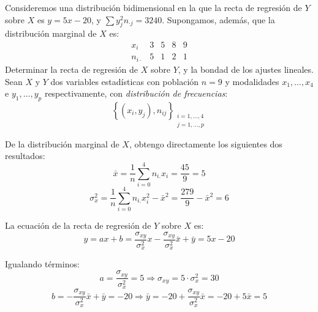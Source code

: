 \begin{ejercicio}
    Consideremos una distribución bidimensional en la que la recta de regresión de $Y$ sobre $X$ es $y = 5x - 20$, y $\sum y_j^2 n_{\cdot j} = 3240$. Supongamos, además, que la distribución marginal de $X$ es:
    \begin{equation*}
        \begin{array}{c|cccc}
            x_i & 3 & 5 & 8 & 9 \\ \hline
            n_{i\cdot} & 5 & 1 & 2 & 1 
        \end{array}
    \end{equation*}
    Determinar la recta de regresión de $X$ sobre $Y$, y la bondad de los ajustes lineales.\\

    Sean $X$ y $Y$ dos variables estadísticas con población $n=9$ y modalidades $x_1, \dots, x_4$ e $y_1, \dots, y_p$ respectivamente, con \emph{distribución de frecuencias}:
        $$\left\{ (x_i,y_j), n_{ij}\right\}_{\substack{i=1,\dots,4\\j=1,\dots,p}}$$

    De la distribución marginal de $X$, obtengo directamente los siguientes dos resultados:
    \begin{equation*}
        \bar{x} = \frac{1}{n}\sum_{i=0}^4 n_{i.}x_i = \frac{45}{9} = 5
    \end{equation*}
    \begin{equation*}
        \sigma_x^2 = \frac{1}{n}\sum_{i=0}^4 n_{i.}x_i^2 - \bar{x}^2 = \frac{279}{9} - \bar{x}^2 = 6
    \end{equation*}

    La ecuación de la recta de regresión de $Y$ sobre $X$ es:
    \begin{equation*}
        y=ax+b = \frac{\sigma_{xy}}{\sigma_x^2}x -\frac{\sigma_{xy}}{\sigma_x^2} \bar{x} + \bar{y} = 5x-20
    \end{equation*}

    Igualando términos:
    \begin{equation*}
        a = \frac{\sigma_{xy}}{\sigma_x^2} = 5 \Longrightarrow \sigma_{xy} = 5 \cdot {\sigma_x^2} = 30
    \end{equation*}
    \begin{equation*}
        b = -\frac{\sigma_{xy}}{\sigma_x^2} \bar{x} + \bar{y} = -20 \Longrightarrow \bar{y} = -20 + \frac{\sigma_{xy}}{\sigma_x^2} \bar{x} = -20+5\bar{x} = 5
    \end{equation*}


\end{ejercicio}
